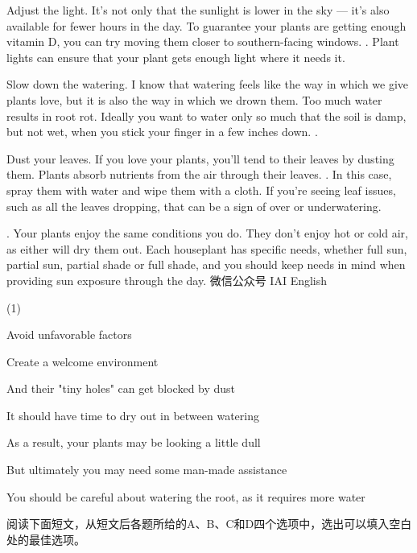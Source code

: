 \documentclass{英语试卷}
\begin{document}
\par Adjust the light. It's not only that the sunlight is lower in the sky — it's also available for fewer hours in the day. To guarantee your plants are getting enough vitamin D, you can try moving them closer to southern-facing windows. . Plant lights can ensure that your plant gets enough light where it needs it.\par
\par Slow down the watering. I know that watering feels like the way in which we give plants love, but it is also the way in which we drown them. Too much water results in root rot. Ideally you want to water only so much that the soil is damp, but not wet, when you stick your finger in a few inches down. .\par
\par Dust your leaves. If you love your plants, you'll tend to their leaves by dusting them. Plants absorb nutrients from the air through their leaves. . In this case, spray them with water and wipe them with a cloth. If you're seeing leaf issues, such as all the leaves dropping, that can be a sign of over or underwatering.\par
\par {}. Your plants enjoy the same conditions you do. They don't enjoy hot or cold air, as either will dry them out. Each houseplant has specific needs, whether full sun, partial sun, partial shade or full shade, and you should keep needs in mind when providing sun exposure through the day. 微信公众号 IAI English\par
\begin{choices}(1)
  \item Avoid unfavorable factors
  \item Create a welcome environment
  \item And their "tiny holes" can get blocked by dust
  \item It should have time to dry out in between watering
  \item As a result, your plants may be looking a little dull
  \item But ultimately you may need some man-made assistance
  \item You should be careful about watering the root, as it requires more water
\end{choices}
\par 阅读下面短文，从短文后各题所给的A、B、C和D四个选项中，选出可以填入空白处的最佳选项。\par
\end{document}
